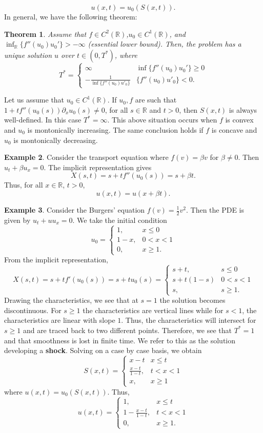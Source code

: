 \documentclass{article}
\newtheorem{theorem}{Theorem}[subsection] %
\theoremstyle{definition}
\newtheorem{example}[theorem]{Example}
\theoremstyle{definition}
\newcommand{\R}{\mathbb{R}}
\begin{document}
$$u(x,t)=u_0(S(x,t)).$$
In general, we have the following theorem:
\begin{theorem}
    Assume that $f\in C^2(\R)$,$u_0\in C^1(\R)$, and $\inf_{\R}\{f''(u_0)u_0'\}>-\infty$ (essential lower bound). Then, the problem has a unique solution $u$ over $t\in (0,T^*)$, where
    $$T^*=\begin{cases}
        \infty&\inf\{f''(u_0)u_0'\}\geq 0 \\
        -\frac{1}{\inf\{f''(u_0)u'_0\}}&\{f''(u_0)u'_0\}<0.
    \end{cases}$$
\end{theorem}
Let us assume that $u_0\in C^1(\R)$. If $u_0,f$ are such that $1+tf''(u_0(s))\partial_{x}u_0(s)\neq 0$, for all $s\in \R$ and $t>0$, then $S(x,t)$ is always well-defined. In this case $T^*=\infty$. This above situation occurs when $f$ is convex and $u_0$ is montonically increasing. The same conclusion holds if $f$ is concave and $u_0$ is montonically decreasing.
\begin{example}
    Consider the transport equation where $f(v)=\beta v$ for $\beta \neq 0$. Then $u_t+\beta u_x=0$. The implicit representation gives
    $$X(s,t)=s+tf''(u_0(s))=s+\beta t.$$
    Thus, for all $x\in \R$, $t>0$,
    $$u(x,t)=u(x+\beta t).$$
\end{example}
\begin{example}
    Consider the Burgers' equation $f(v)=\frac{1}{2}v^2$. Then the PDE is given by  $u_t+uu_x=0$. We take the initial condition
    $$u_0=\begin{cases}
        1,&x\leq 0 \\
        1-x,&0<x<1 \\
        0,&x\geq 1.
    \end{cases}$$
    From the implicit representation,
    $$X(s,t)=s+tf'(u_0(s))=s+tu_0(s)=\begin{cases}
        s+t,&s\leq 0 \\
        s+t(1-s)&0<s<1 \\
        s,&s\geq 1.
    \end{cases}$$
    Drawing the characteristics, we see that at $s=1$ the solution becomes discontinuous. For $s\geq 1$ the characteristics are vertical lines while for $s<1$, the characteristics are linear with slope $1$. Thus, the characteristics will intersect for $s\geq 1$ and are traced back to two different points. Therefore, we see that $T^*=1$ and that smoothness is lost in finite time. We refer to this as the solution developing a \textbf{shock}.
    Solving on a case by case basis, we obtain
    $$S(x,t)=\begin{cases}
        x-t & x\leq t \\
        \frac{x-t}{1-t},&t<x<1 \\
        x,&x\geq 1
    \end{cases}$$
    where $u(x,t)=u_0(S(x,t))$. Thus,
    $$u(x,t)=\begin{cases}
        1,&x\leq t \\
        1-\frac{x-t}{1-t},&t<x<1 \\
        0,&x\geq 1.
    \end{cases}$$
\end{example}
\end{document}
